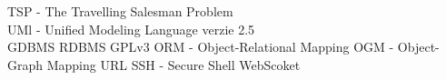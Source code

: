 TSP - The Travelling Salesman Problem\\
UMl - Unified Modeling Language verzie 2.5\\
GDBMS
RDBMS
GPLv3
ORM - Object-Relational Mapping
OGM - Object-Graph Mapping
URL
SSH - Secure Shell
WebScoket
